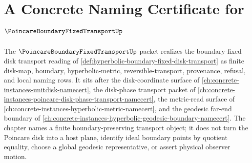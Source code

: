 \chapter{A Concrete Naming Certificate for $\PoincareBoundaryFixedTransportUp$}
\label{ch:concrete-instances-poincare-boundary-fixed-transport-namecert}

The $\PoincareBoundaryFixedTransportUp$ packet realizes the boundary-fixed disk transport reading of \autoref{def:hyperbolic-boundary-fixed-disk-transport} as finite disk-map, boundary, hyperbolic-metric, reversible-transport, provenance, refusal, and local naming rows. It sits after the disk-coordinate surface of \autoref{ch:concrete-instances-unitdisk-namecert}, the disk-phase transport packet of \autoref{ch:concrete-instances-poincare-disk-phase-transport-namecert}, the metric-read surface of \autoref{ch:concrete-instances-hyperbolic-metric-namecert}, and the geodesic far-end boundary of \autoref{ch:concrete-instances-hyperbolic-geodesic-boundary-namecert}. The chapter names a finite boundary-preserving transport object; it does not turn the Poincare disk into a host plane, identify ideal boundary points by quotient equality, choose a global geodesic representative, or assert physical observer motion.

